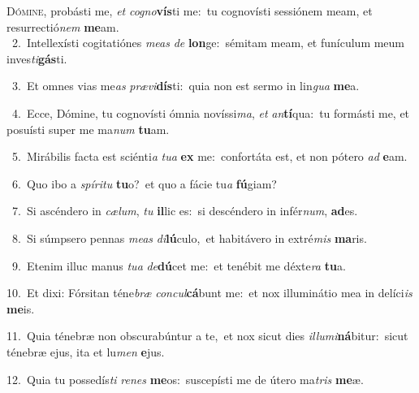 \lettrine{\initial\textcolor{\initialcolor}{D}}{ómine,} probásti me, \textit{et} \textit{co}\-\textit{gno}\textbf{vís}ti me:~\star tu cognovísti sessiónem meam, et resurrectió\textit{nem} \textbf{me}\-am.\\
{\numbfont\textcolor{\numbcolor}{~2.}}~Intellexísti cogitatiónes \textit{me}\-\textit{as} \textit{de} \textbf{lon}\-ge:~\star sémitam meam, et funículum meum inves\-\textit{ti}\-\textbf{gás}ti.\par
{\numbfont\textcolor{\numbcolor}{~3.}}~Et omnes vias me\textit{as} \textit{præ}\-\textit{vi}\textbf{dís}ti:~\star quia non est sermo in lin\textit{gua} \textbf{me}\-a.\par
{\numbfont\textcolor{\numbcolor}{~4.}}~Ecce, Dómine, tu cognovísti ómnia novíssi\-\textit{ma}\-, \textit{et} \textit{an}\-\textbf{tí}qua:~\star tu formásti me, et posuísti super me ma\textit{num} \textbf{tu}\-am.\par
{\numbfont\textcolor{\numbcolor}{~5.}}~Mirábilis facta est sciénti\textit{a} \textit{tu}\-\textit{a} \textbf{ex} me:~\star confortáta est, et non pótero \textit{ad} \textbf{e}\-am.\par
{\numbfont\textcolor{\numbcolor}{~6.}}~Quo ibo a \textit{spí}\-\textit{ri}\textit{tu} \textbf{tu}\-o?~\star et quo a fácie tu\textit{a} \textbf{fú}\-giam?\par
{\numbfont\textcolor{\numbcolor}{~7.}}~Si ascéndero in \textit{cæ}\-\textit{lum}, \textit{tu} \textbf{il}\-lic es:~\star si descéndero in infér\-\textit{num}\-, \textbf{ad}\-es.\par
{\numbfont\textcolor{\numbcolor}{~8.}}~Si súmpsero pennas \textit{me}\-\textit{as} \textit{di}\-\textbf{lú}culo,~\star et habitávero in extré\textit{mis} \textbf{ma}\-ris.\par
{\numbfont\textcolor{\numbcolor}{~9.}}~Etenim illuc manus \textit{tu}\-\textit{a} \textit{de}\-\textbf{dú}cet me:~\star et tenébit me déxte\textit{ra} \textbf{tu}\-a.\par
{\numbfont\textcolor{\numbcolor}{10.}}~Et dixi: Fórsitan téne\textit{bræ} \textit{con}\-\textit{cul}\textbf{cá}bunt me:~\star et nox illuminátio mea in delíci\textit{is} \textbf{me}\-is.\par
{\numbfont\textcolor{\numbcolor}{11.}}~Quia ténebræ non obscurabúntur a te,~\dagger et nox sicut dies \textit{il}\-\textit{lu}\textit{mi}\textbf{ná}bitur:~\star sicut ténebræ ejus, ita et lu\textit{men} \textbf{e}\-jus.\par
{\numbfont\textcolor{\numbcolor}{12.}}~Quia tu possedís\textit{ti} \textit{re}\-\textit{nes} \textbf{me}\-os:~\star suscepísti me de útero ma\textit{tris} \textbf{me}\-æ.\par
